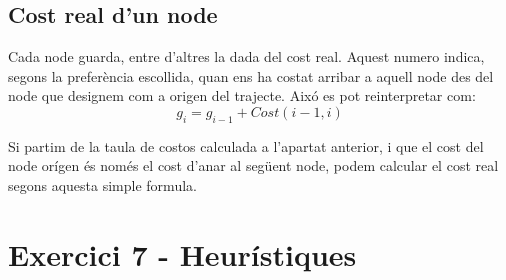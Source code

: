 \documentclass[a4paper,12pt,hidelinks]{article}
\begin{document}
            \subsection{Cost real d’un node}
            \label{subsec:CostRealNode}

                Cada node guarda, entre d’altres la dada del cost real. Aquest numero indica, segons la preferència escollida, quan ens ha costat arribar a aquell node des del node que designem com a origen del trajecte. Aixó es pot reinterpretar com: 
                \begin{equation*} \label{eq:realcost}
                    g_i = g_{i-1} + Cost(i-1, i)
                \end{equation*}
     
                Si partim de la taula de costos calculada a l’apartat anterior, i que el cost del node orígen és només el cost d’anar al següent node, podem calcular el cost real segons aquesta simple formula.
    
        \section{Exercici 7 - Heurístiques}
        \label{sec:Exercici7}
\end{document}
